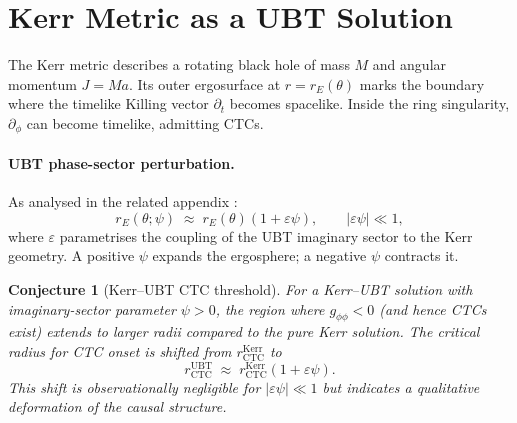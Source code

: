 \documentclass[12pt]{article}
\newtheorem{conjecture}{Conjecture}
\begin{document}
\section{Kerr Metric as a UBT Solution}
The Kerr metric describes a rotating black hole of mass $M$ and angular
momentum $J = Ma$.  Its outer ergosurface at $r = r_E(\theta)$ marks the
boundary where the timelike Killing vector $\partial_t$ becomes spacelike.
Inside the ring singularity, $\partial_\phi$ can become timelike, admitting
CTCs.

\paragraph{UBT phase-sector perturbation.}
As analysed in the related appendix \cite{AppJ}:
\begin{equation}
  r_E(\theta;\psi) \;\approx\; r_E(\theta)\left(1 + \varepsilon\psi\right),
  \qquad |\varepsilon\psi| \ll 1,
\end{equation}
where $\varepsilon$ parametrises the coupling of the UBT imaginary sector
to the Kerr geometry.  A positive $\psi$ expands the ergo\-sphere; a
negative $\psi$ contracts it.

\begin{conjecture}[Kerr–UBT CTC threshold]
\label{conj:kerr_ubt}
For a Kerr–UBT solution with imaginary-sector parameter $\psi > 0$, the
region where $g_{\phi\phi} < 0$ (and hence CTCs exist) extends to larger
radii compared to the pure Kerr solution.  The critical radius for CTC
onset is shifted from $r_{\mathrm{CTC}}^{\mathrm{Kerr}}$ to
\begin{equation}
  r_{\mathrm{CTC}}^{\mathrm{UBT}} \;\approx\;
  r_{\mathrm{CTC}}^{\mathrm{Kerr}}\left(1 + \varepsilon\psi\right).
\end{equation}
This shift is observationally negligible for $|\varepsilon\psi| \ll 1$ but
indicates a qualitative deformation of the causal structure.
\end{conjecture}

\end{document}
